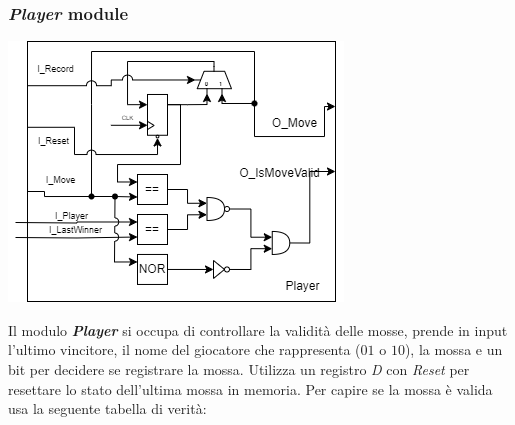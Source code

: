 \documentclass[a4paper,11pt]{article}
\newcommand{\inctxt}[1]{\textit{\fontfamily{zi4}\selectfont #1}}
\begin{document}
\newpage
\subsubsection{\inctxt{Player} module}
    \begin{center}
        \includegraphics[width=0.6\linewidth]{assets/Modules/Player.png}
    \end{center}
    Il modulo \textbf{\inctxt{Player}} si occupa di controllare la validità delle mosse, prende in input l'ultimo vincitore, il nome del giocatore che rappresenta ($01$ o $10$), la mossa e un bit per decidere se registrare la mossa.
    Utilizza un registro \inctxt{D} con \inctxt{Reset} per resettare lo stato dell'ultima mossa in memoria.
    Per capire se la mossa è valida usa la seguente tabella di verità:

    \begin{table}[hbt!]
    \centering
    \end{table}
\end{document}
